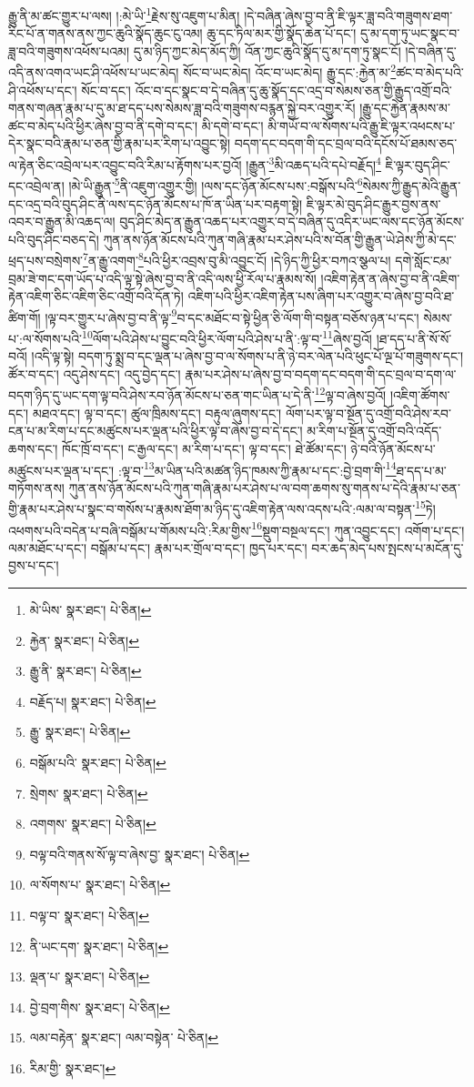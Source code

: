 རྒྱུ་ནི་མ་ཚང་གྱུར་པ་ལས། །:མེ་ཡི་\footnote{མེ་ཡིས་  སྣར་ཐང་།  པེ་ཅིན། }རྗེས་སུ་འཇུག་པ་མིན། །དེ་བཞིན་ཞེས་བྱ་བ་ནི་ཇི་ལྟར་ཟླ་བའི་གཟུགས་ཐག་རིང་པོ་ན་གནས་ནས་ཀྱང་ཆུའི་སྣོད་ཆུང་ངུ་འམ། ཆུ་དང་ཏིལ་མར་གྱི་སྣོད་ཆེན་པོ་དང་། དུ་མ་དག་ཏུ་ཡང་སྣང་བ་ཟླ་བའི་གཟུགས་འཕོས་པའམ། དུ་མ་ཉིད་ཀྱང་མེད་མོད་ཀྱི། འོན་ཀྱང་ཆུའི་སྣོད་དུ་མ་དག་ཏུ་སྣང་ངོ། །དེ་བཞིན་དུ་འདི་ནས་འགའ་ཡང་ཤི་འཕོས་པ་ཡང་མེད། སོང་བ་ཡང་མེད། འོང་བ་ཡང་མེད། རྒྱུ་དང་:རྐྱེན་མ་\footnote{རྐྱེན་  སྣར་ཐང་།  པེ་ཅིན། }ཚང་བ་མེད་པའི་ཤི་འཕོས་པ་དང་། སོང་བ་དང་། འོང་བ་དང་སྣང་བ་དེ་བཞིན་དུ་ཆུ་སྣོད་དང་འདྲ་བ་སེམས་ཅན་གྱི་རྒྱུད་འགྲོ་བའི་གནས་གཞན་རྣམ་པ་དུ་མ་ཐ་དད་པས་སེམས་ཟླ་བའི་གཟུགས་བརྙན་སྐྱེ་བར་འགྱུར་རོ། །རྒྱུ་དང་རྐྱེན་རྣམས་མ་ཚང་བ་མེད་པའི་ཕྱིར་ཞེས་བྱ་བ་ནི་དགེ་བ་དང་། མི་དགེ་བ་དང་། མི་གཡོ་བ་ལ་སོགས་པའི་རྒྱུ་ཇི་ལྟར་འཕངས་པ་དེར་སྣང་བའི་རྣམ་པ་ཅན་གྱི་རྣམ་པར་རིག་པ་འབྱུང་སྟེ། བདག་དང་བདག་གི་དང་བྲལ་བའི་དངོས་པོ་ཐམས་ཅད་ལ་རྟེན་ཅིང་འབྲེལ་པར་འབྱུང་བའི་རིམ་པ་རྟོགས་པར་བྱའོ། །རྒྱུན་\footnote{རྒྱུ་ནི་  སྣར་ཐང་།  པེ་ཅིན། }མི་འཆད་པའི་དཔེ་བརྗོད།\footnote{བརྗོད་པ།  སྣར་ཐང་།  པེ་ཅིན། } ཇི་ལྟར་བུད་ཤིང་དང་འབྲེལ་ན། །མེ་ཡི་རྒྱུན་\footnote{རྒྱུ་  སྣར་ཐང་།  པེ་ཅིན། }ནི་འཇུག་འགྱུར་གྱི། །ལས་དང་ཉོན་མོངས་པས་:བསྒོས་པའི་\footnote{བསྒོམ་པའི་  སྣར་ཐང་།  པེ་ཅིན། }སེམས་ཀྱི་རྒྱུད་མེའི་རྒྱུན་དང་འདྲ་བའི་བུད་ཤིང་ནི་ལས་དང་ཉོན་མོངས་པ་ཁོ་ན་ཡིན་པར་བརྟག་སྟེ། ཇི་ལྟར་མེ་བུད་ཤིང་རྒྱུར་བྱས་ནས་འབར་བ་རྒྱུན་མི་འཆད་ལ། བུད་ཤིང་མེད་ན་རྒྱུན་འཆད་པར་འགྱུར་བ་དེ་བཞིན་དུ་འདིར་ཡང་ལས་དང་ཉོན་མོངས་པའི་བུད་ཤིང་བཅད་དེ། ཀུན་ནས་ཉོན་མོངས་པའི་ཀུན་གཞི་རྣམ་པར་ཤེས་པའི་ས་བོན་གྱི་རྒྱུན་ཡེ་ཤེས་ཀྱི་མེ་དང་ཕྲད་པས་བསྲེགས་\footnote{སྲེགས་  སྣར་ཐང་།  པེ་ཅིན། }ན་རྒྱུ་འགག་\footnote{འགགས་  སྣར་ཐང་།  པེ་ཅིན། }པའི་ཕྱིར་འབྲས་བུ་མི་འབྱུང་ངོ། །དེ་ཉིད་ཀྱི་ཕྱིར་བཀའ་སྩལ་པ། དགེ་སློང་ངམ་བྲམ་ཟེ་གང་དག་ཡོད་པ་འདི་ལྟ་སྟེ་ཞེས་བྱ་བ་ནི་འདི་ལས་ཕྱི་རོལ་པ་རྣམས་སོ། །འཇིག་རྟེན་ན་ཞེས་བྱ་བ་ནི་འཇིག་རྟེན་འཇིག་ཅིང་འཇིག་ཅིང་འགྲོ་བའི་དོན་ཏེ། འཇིག་པའི་ཕྱིར་འཇིག་རྟེན་པས་ཞིག་པར་འགྱུར་བ་ཞེས་བྱ་བའི་ཐ་ཚིག་གོ། །ལྟ་བར་གྱུར་པ་ཞེས་བྱ་བ་ནི་ལྟ་\footnote{བལྟ་བའི་གནས་སོ་ལྟ་བ་ཞེས་བྱ་  སྣར་ཐང་།  པེ་ཅིན། }བ་དང་མཐོང་བ་སྟེ་ཕྱིན་ཅི་ལོག་གི་བསྟན་བཅོས་ཉན་པ་དང་། སེམས་པ་:ལ་སོགས་པའི་\footnote{ལ་སོགས་པ་  སྣར་ཐང་།  པེ་ཅིན། }ལོག་པའི་ཤེས་པ་བྱུང་བའི་ཕྱིར་ལོག་པའི་ཤེས་པ་ནི་:ལྟ་བ་\footnote{བལྟ་བ་  སྣར་ཐང་།  པེ་ཅིན། }ཞེས་བྱའོ། །ཐ་དད་པ་ནི་སོ་སོ་བའོ། །འདི་ལྟ་སྟེ། བདག་ཏུ་སྨྲ་བ་དང་ལྡན་པ་ཞེས་བྱ་བ་ལ་སོགས་པ་ནི་ཉེ་བར་ལེན་པའི་ཕུང་པོ་ལྔ་པོ་གཟུགས་དང་། ཚོར་བ་དང་། འདུ་ཤེས་དང་། འདུ་བྱེད་དང་། རྣམ་པར་ཤེས་པ་ཞེས་བྱ་བ་བདག་དང་བདག་གི་དང་བྲལ་བ་དག་ལ་བདག་ཉིད་དུ་ཡང་དག་ལྟ་བའི་ཤེས་རབ་ཉོན་མོངས་པ་ཅན་གང་ཡིན་པ་དེ་ནི་\footnote{ནི་ཡང་དག་  སྣར་ཐང་།  པེ་ཅིན། }ལྟ་བ་ཞེས་བྱའོ། །འཇིག་ཚོགས་དང་། མཐའ་དང་། ལྟ་བ་དང་། ཚུལ་ཁྲིམས་དང་། བརྟུལ་ཞུགས་དང་། ལོག་པར་ལྟ་བ་སྔོན་དུ་འགྲོ་བའི་ཤེས་རབ་ངན་པ་མ་རིག་པ་དང་མཚུངས་པར་ལྡན་པའི་ཕྱིར་ལྟ་བ་ཞེས་བྱ་བ་དེ་དང་། མ་རིག་པ་སྔོན་དུ་འགྲོ་བའི་འདོད་ཆགས་དང་། ཁོང་ཁྲོ་བ་དང་། ང་རྒྱལ་དང་། མ་རིག་པ་དང་། ལྟ་བ་དང་། ཐེ་ཚོམ་དང་། ཉེ་བའི་ཉོན་མོངས་པ་མཚུངས་པར་ལྡན་པ་དང་། :ལྟ་བ་\footnote{ལྡན་པ་  སྣར་ཐང་།  པེ་ཅིན། }མ་ཡིན་པའི་མཚན་ཉིད་ཁམས་ཀྱི་རྣམ་པ་དང་:བྱེ་བྲག་གི་\footnote{བྱེ་བྲག་གིས་  སྣར་ཐང་།  པེ་ཅིན། }ཐ་དད་པ་མ་གཏོགས་ནས། ཀུན་ནས་ཉོན་མོངས་པའི་ཀུན་གཞི་རྣམ་པར་ཤེས་པ་ལ་བག་ཆགས་སུ་གནས་པ་དེའི་རྣམ་པ་ཅན་གྱི་རྣམ་པར་ཤེས་པ་སྣང་བ་གསོས་པ་རྣམས་ཐོག་མ་ཉིད་དུ་འཇིག་རྟེན་ལས་འདས་པའི་:ལམ་ལ་བསྟན་\footnote{ལམ་བརྟེན་  སྣར་ཐང་། ལམ་བསྟེན་  པེ་ཅིན། }ཏེ། འཕགས་པའི་བདེན་པ་བཞི་བསྒོམ་པ་གོམས་པའི་:རིམ་གྱིས་\footnote{རིམ་གྱི་  སྣར་ཐང་། }སྡུག་བསྔལ་དང་། ཀུན་འབྱུང་དང་། འགོག་པ་དང་། ལམ་མཐོང་པ་དང་། བསྒོམ་པ་དང་། རྣམ་པར་གྲོལ་བ་དང་། ཁྱད་པར་དང་། བར་ཆད་མེད་པས་སྤངས་པ་མངོན་དུ་བྱས་པ་དང་། 